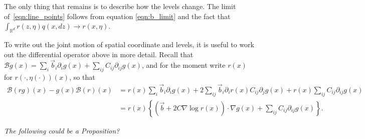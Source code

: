 \documentclass[12pt]{article}
\newcommand{\IR}{\mathbb R}
\newcommand{\grad}{\nabla}
\newcommand{\DG}{\mathcal{B}}  %
\newcommand{\meanq}{\vec b}    %
\newcommand{\covq}{C}     %
\newcommand{\comment}[1]{{\color{blue} \it #1}}
\begin{document}
The only thing that remains is to describe how the levels change.
The limit of~\eqref{eqn:line_points} follows from
equation \eqref{eqn:b_limit} and the fact that
$\int_{\IR^d} r(z, \eta) q(x, dz) \to r(x, \eta)$.

To write out the joint motion of spatial coordinate and levels,
it is useful to work out the differential operator above in more detail.
Recall that $\DG g(x) = \sum_i \meanq_i \partial_i g(x) + \sum_{ij} \covq_{ij} \partial_{ij} g(x)$,
and for the moment write $r(x)$ for $r(\cdot, \eta(\cdot))(x)$,
so that
\begin{align}
\DG(rg)(x) - g(x) \DG(r)(x)
    &= \nonumber
    r(x) \sum_i \meanq_i \partial_i g(x)
    + 2 \sum_{ij} \meanq_i \partial_i r(x) \covq_{ij} \partial_j g(x)
    + r(x) \sum_{ij} \covq_{ij} \partial_{ij} g(x) \\
    &= \label{eqn:limiting_generator}
    r(x) \left\{
        \left(
        \meanq
        + 2 \covq \grad \log r(x)
        \right)
        \cdot
        \grad g(x)
        +
        \sum_{ij} \covq_{ij} \partial_{ij} g(x)
    \right\} .
\end{align}

\comment{The following could be a Proposition?}
\end{document}
